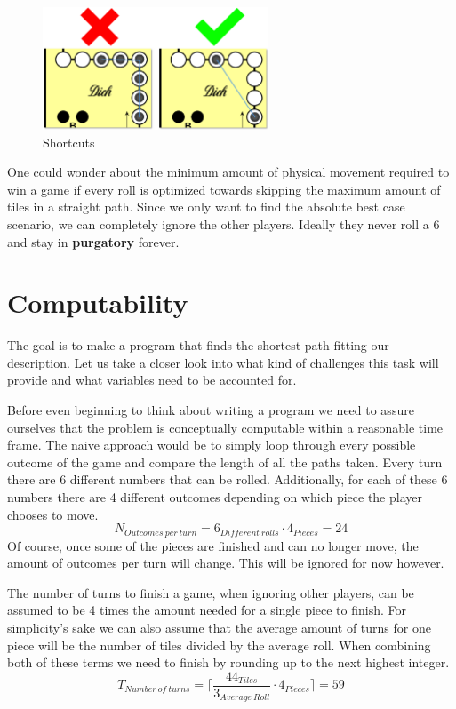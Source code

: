\documentclass[12pt]{article}
\begin{document}
\begin{figure}[htbp]
    \centering
    \includegraphics[width=0.6\textwidth]{images/Figure2}
    \caption{Shortcuts}
    \label{fig:shortcuts}
\end{figure}

One could wonder about the minimum amount of physical movement required to win a game if every roll is optimized towards skipping the maximum amount of tiles in a straight path. Since we only want to find the absolute best case scenario, we can completely ignore the other players. Ideally they never roll a 6 and stay in \textbf{purgatory} forever.


\section{Computability}\label{sec:computability}
The goal is to make a program that finds the shortest path fitting our description. Let us take a closer look into what kind of challenges this task will provide and what variables need to be accounted for.

Before even beginning to think about writing a program we need to assure ourselves that the problem is conceptually computable within a reasonable time frame.
The naive approach would be to simply loop through every possible outcome of the game and compare the length of all the paths
taken.
Every turn there are 6 different numbers that can be rolled. Additionally, for each of these 6 numbers there are 4 different outcomes depending on which piece the player chooses to move.
\[
    N_{Outcomes~per~turn} = 6_{Different~rolls} \cdot 4_{Pieces} = 24
\]
Of course, once some of the pieces are finished and can no longer move, the amount of outcomes per turn will change. This will be ignored for now however.

The number of turns to finish a game, when ignoring other players, can be assumed to be 4 times the amount needed for a single piece to finish. For simplicity's sake we can also assume that the average amount of turns for one piece will be the number of tiles divided by the average roll. When combining both of these terms we need to finish by rounding up to the next highest integer.
\[
    T_{Number~of~turns} =  \lceil \frac{44_{Tiles}}{3_{Average~Roll}} \cdot 4_{Pieces} \rceil
    =  59
\]
\end{document}
